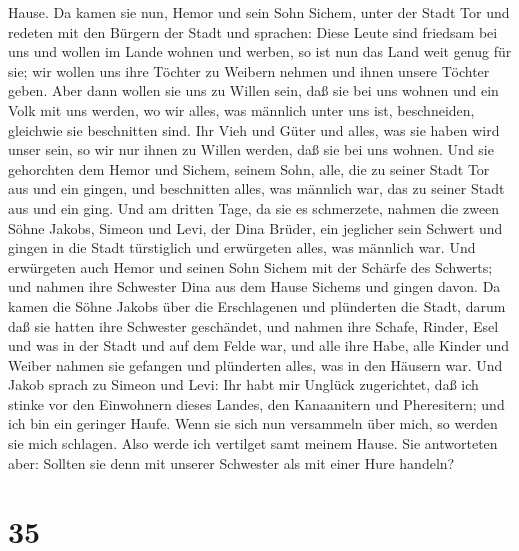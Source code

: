 Hause.  Da kamen sie nun, Hemor und sein Sohn Sichem, unter
der Stadt Tor und redeten mit den Bürgern der Stadt und sprachen:
 Diese Leute sind friedsam bei uns und wollen im Lande
wohnen und werben, so ist nun das Land weit genug für sie; wir wollen
uns ihre Töchter zu Weibern nehmen und ihnen unsere Töchter geben.
 Aber dann wollen sie uns zu Willen sein, daß sie bei uns
wohnen und ein Volk mit uns werden, wo wir alles, was männlich unter uns
ist, beschneiden, gleichwie sie beschnitten sind.  Ihr Vieh
und Güter und alles, was sie haben wird unser sein, so wir nur ihnen zu
Willen werden, daß sie bei uns wohnen.  Und sie gehorchten
dem Hemor und Sichem, seinem Sohn, alle, die zu seiner Stadt Tor aus und
ein gingen, und beschnitten alles, was männlich war, das zu seiner Stadt
aus und ein ging.  Und am dritten Tage, da sie es
schmerzete, nahmen die zween Söhne Jakobs, Simeon und Levi, der Dina
Brüder, ein jeglicher sein Schwert und gingen in die Stadt türstiglich
und erwürgeten alles, was männlich war.  Und erwürgeten
auch Hemor und seinen Sohn Sichem mit der Schärfe des Schwerts; und
nahmen ihre Schwester Dina aus dem Hause Sichems und gingen davon.
 Da kamen die Söhne Jakobs über die Erschlagenen und
plünderten die Stadt, darum daß sie hatten ihre Schwester geschändet,
 und nahmen ihre Schafe, Rinder, Esel und was in der Stadt
und auf dem Felde war,  und alle ihre Habe, alle Kinder und
Weiber nahmen sie gefangen und plünderten alles, was in den Häusern war.
 Und Jakob sprach zu Simeon und Levi: Ihr habt mir Unglück
zugerichtet, daß ich stinke vor den Einwohnern dieses Landes, den
Kanaanitern und Pheresitern; und ich bin ein geringer Haufe. Wenn sie
sich nun versammeln über mich, so werden sie mich schlagen. Also werde
ich vertilget samt meinem Hause.  Sie antworteten aber:
Sollten sie denn mit unserer Schwester als mit einer Hure handeln?

\hypertarget{section-34}{%
\section{35}\label{section-34}}

